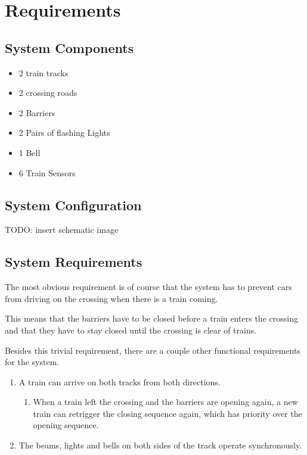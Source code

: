 \documentclass[final]{report}
\begin{document}
\chapter{Requirements}

\section{System Components}
\begin{itemize}
\item 2 train tracks
\item 2 crossing roads
\item 2 Barriers
\item 2 Pairs of flashing Lights
\item 1 Bell
\item 6 Train Sensors
\end{itemize}
\section{System Configuration}
TODO: insert schematic image

\section{System Requirements}
The most obvious requirement is of course that the system has to prevent cars from driving on the crossing when there is a train coming.

This means that the barriers have to be closed before a train enters the crossing and that they have to stay closed until the crossing is clear of trains.

Besides this trivial requirement, there are a couple other functional requirements for the system.

\begin{enumerate}
\item A train can arrive on both tracks from both directions.
	\begin{enumerate}
	\item When a train left the crossing and the barriers are opening again, a new train can retrigger the closing sequence again, which has priority over the opening sequence.
	\end{enumerate}

\item The beams, lights and bells on both sides of the track operate synchronously.
\end{enumerate}
\end{document}
